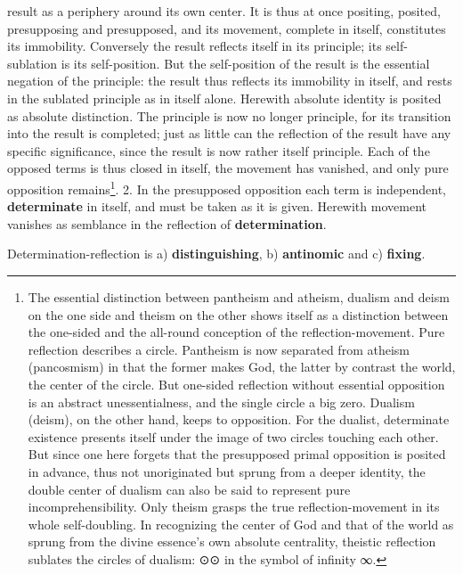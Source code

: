\documentclass[12pt,a4paper,openany]{book}
\newcommand{\opage}[1]{\marginnote{\footnotesize\textit{[#1]}}}
\begin{document}
result as a periphery around its own center. It is thus at once positing, posited,
\setcounter{footnote}{0}%
\opage{105}presupposing and presupposed, and its movement, complete in itself, constitutes its immobility. Conversely the result reflects itself in its principle; its self-sublation is its self-position. But the self-position of the result is the essential negation of the principle: the result thus reflects its immobility in itself, and rests in the sublated principle as in itself alone. Herewith absolute identity is posited as absolute distinction. The principle is now no longer principle, for its transition into the result is completed; just as little can the reflection of the result have any specific significance, since the result is now rather itself principle. Each of the opposed terms is thus closed in itself, the movement has vanished, and only pure opposition remains\footnote{The essential distinction between pantheism and atheism, dualism and deism on the one side and theism on the other shows itself as a distinction between the one-sided and the all-round conception of the reflection-movement. Pure reflection describes a circle. Pantheism is now separated from atheism (pancosmism) in that the former makes God, the latter by contrast the world, the center of the circle. But one-sided reflection without essential opposition is an abstract unessentialness, and the single circle a big zero. Dualism (deism), on the other hand, keeps to opposition. For the dualist, determinate existence presents itself under the image of two circles touching each other. But since one here forgets that the presupposed primal opposition is posited in advance, thus not unoriginated but sprung from a deeper identity, the double center of dualism can also be said to represent pure incomprehensibility. Only theism grasps the true reflection-movement in its whole self-doubling. In recognizing the center of God and that of the world as sprung from the divine essence's own absolute centrality, theistic reflection sublates the circles of dualism: ⊙⊙ in the symbol of infinity ∞.}.
\setcounter{footnote}{0}%
\opage{106}2. In the presupposed opposition each term is independent, \textbf{determinate} in itself, and must be taken as it is given. Herewith movement vanishes as semblance in the reflection of \textbf{determination}.

Determination-reflection is a) \textbf{distinguishing}, b) \textbf{antinomic} and c) \textbf{fixing}.
\end{document}
